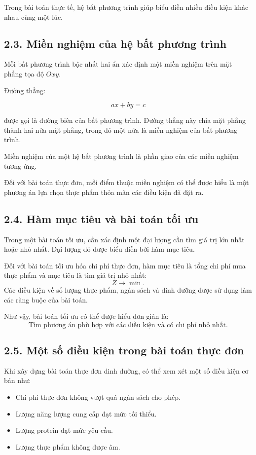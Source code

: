 \documentclass[12pt,a4paper]{article}
\begin{document}
Trong bài toán thực tế, hệ bất phương trình giúp biểu diễn nhiều điều kiện khác nhau cùng một lúc.

\subsection*{2.3. Miền nghiệm của hệ bất phương trình}

Mỗi bất phương trình bậc nhất hai ẩn xác định một miền nghiệm trên mặt phẳng tọa độ $Oxy$.

Đường thẳng:

\[
ax+by=c
\]

được gọi là đường biên của bất phương trình. Đường thẳng này chia mặt phẳng thành hai nửa mặt phẳng, trong đó một nửa là miền nghiệm của bất phương trình.

Miền nghiệm của một hệ bất phương trình là phần giao của các miền nghiệm tương ứng.

Đối với bài toán thực đơn, mỗi điểm thuộc miền nghiệm có thể được hiểu là một phương án lựa chọn thực phẩm thỏa mãn các điều kiện đã đặt ra.

\subsection*{2.4. Hàm mục tiêu và bài toán tối ưu}

Trong một bài toán tối ưu, cần xác định một đại lượng cần tìm giá trị lớn nhất hoặc nhỏ nhất. Đại lượng đó được biểu diễn bởi hàm mục tiêu.

Đối với bài toán tối ưu hóa chi phí thực đơn, hàm mục tiêu là tổng chi phí mua thực phẩm và mục tiêu là tìm giá trị nhỏ nhất:
\[
Z\longrightarrow\min.
\]
Các điều kiện về số lượng thực phẩm, ngân sách và dinh dưỡng được sử dụng làm các ràng buộc của bài toán.

Như vậy, bài toán tối ưu có thể được hiểu đơn giản là:
\[
\boxed{
\text{Tìm phương án phù hợp với các điều kiện và có chi phí nhỏ nhất.}
}
\]

\subsection*{2.5. Một số điều kiện trong bài toán thực đơn}

Khi xây dựng bài toán thực đơn dinh dưỡng, có thể xem xét một số điều kiện cơ bản như:
\begin{itemize}
    \item Chi phí thực đơn không vượt quá ngân sách cho phép.
    \item Lượng năng lượng cung cấp đạt mức tối thiểu.
    \item Lượng protein đạt mức yêu cầu.
    \item Lượng thực phẩm không được âm.
\end{itemize}
\end{document}
